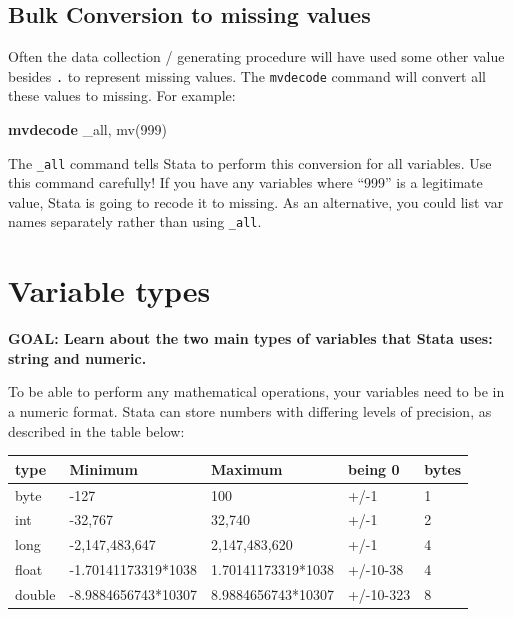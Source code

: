 \documentclass[
]{book}
\newenvironment{Shaded}{\begin{snugshade}}{\end{snugshade}}
\newcommand{\DataTypeTok}[1]{\textcolor[rgb]{0.13,0.29,0.53}{#1}}
\newcommand{\KeywordTok}[1]{\textcolor[rgb]{0.13,0.29,0.53}{\textbf{#1}}}
\newcommand{\NormalTok}[1]{#1}
\begin{document}
\hypertarget{bulk-conversion-to-missing-values}{%
\subsection{Bulk Conversion to missing values}\label{bulk-conversion-to-missing-values}}

Often the data collection / generating procedure will have used some other value besides \texttt{.} to represent missing values. The \texttt{mvdecode} command will convert all these values to missing. For example:

\begin{Shaded}
\begin{Highlighting}[]
\KeywordTok{mvdecode} \DataTypeTok{\_all}\NormalTok{, mv(999)}
\end{Highlighting}
\end{Shaded}

The \texttt{\_all} command tells Stata to perform this conversion for all variables. Use this command carefully! If you have any variables where ``999'' is a legitimate value, Stata is going to recode it to missing. As an alternative, you could list var names separately rather than using \texttt{\_all}.

\hypertarget{variable-types}{%
\section{Variable types}\label{variable-types}}

\begin{alert}

\textbf{GOAL: Learn about the two main types of variables that Stata uses: string and numeric.}

\end{alert}

To be able to perform any mathematical operations, your variables need to be in a numeric format. Stata can store numbers with differing levels of precision, as described in the table below:

\begin{longtable}[]{@{}lllll@{}}
\toprule
type & Minimum & Maximum & being 0 & bytes\tabularnewline
\midrule
\endhead
byte & -127 & 100 & +/-1 & 1\tabularnewline
int & -32,767 & 32,740 & +/-1 & 2\tabularnewline
long & -2,147,483,647 & 2,147,483,620 & +/-1 & 4\tabularnewline
float & -1.70141173319*1038 & 1.70141173319*1038 & +/-10-38 & 4\tabularnewline
double & -8.9884656743*10307 & 8.9884656743*10307 & +/-10-323 & 8\tabularnewline
\bottomrule
\end{longtable}
\end{document}
